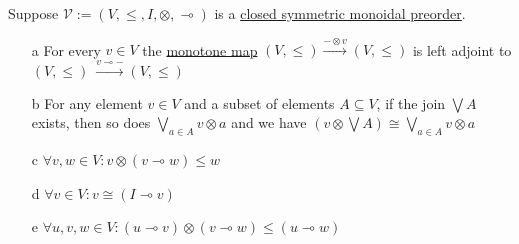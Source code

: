 Suppose $\mathcal{V}:=(V,\leq,I,\otimes,\multimap)$ is a \hyperref[D2.79]{closed symmetric monoidal preorder}.
    \begin{itemize}
      \item[a] For every $v \in V$ the \hyperref[D1.59]{monotone map} $(V, \leq) \xrightarrow{-\otimes v}(V,\leq)$ is left adjoint to $(V, \leq)\ \xrightarrow{v \multimap -} (V,\leq)$
      \item[b]For any element $v \in V$ and a subset of elements $A \subseteq V$, if the join $\bigvee A$ exists, then so does $\bigvee_{a \in A} v \otimes a$ and we have $(v \otimes \bigvee A)\cong  \bigvee_{a \in A} v \otimes a$
      \item[c]$\forall v,w \in V: v \otimes (v \multimap w) \leq w$
      \item[d]$\forall v \in V: v \cong (I \multimap v)$
      \item[e]$\forall u,v,w \in V: (u \multimap v) \otimes (v \multimap w) \leq (u \multimap w)$
    \end{itemize}